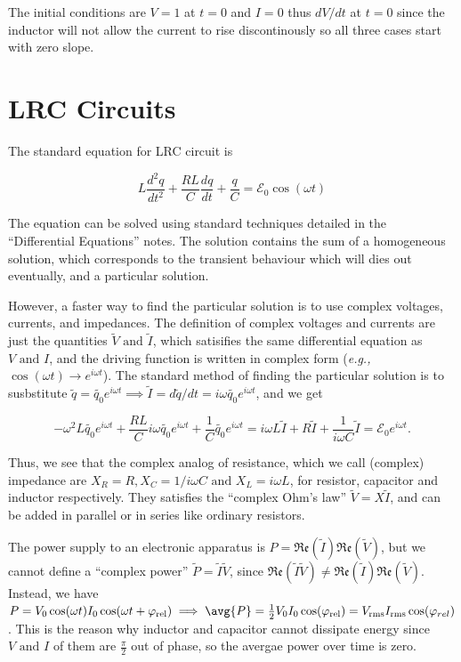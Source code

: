 \documentclass[english,a4paper,12pt]{report}
\begin{document}
The initial conditions are \(V=1\) at \(t=0\) and \(I = 0\)  thus \(dV /dt \)  at \(t=0\)  since the inductor will not allow the current to rise discontinously so all three cases start with zero slope.

\section{LRC Circuits}

The standard equation for LRC circuit is 

\begin{equation}
     L\frac{d^2q}{dt^2} + \frac{RL}{C}\frac{dq}{dt} + \frac{q}{C} = \mathcal{E}_{0}\cos (\omega t) 
\end{equation}

The equation can be solved using standard techniques detailed in the ``Differential Equations'' notes. The solution contains the sum of a homogeneous solution, which corresponds to the transient behaviour which will dies out eventually, and a particular solution. 

However, a faster way to find the particular solution is to use complex voltages, currents, and impedances. The definition of complex voltages and currents are just the quantities \(\tilde{V} \text { and } \tilde{I} \), which satisifies the same differential equation as \(V \text { and } I\), and the driving function is written in complex form (\textit{e.g.,} \(\cos (\omega t) \to e^{i \omega t} \)). The standard method of finding the particular solution is to susbstitute \(\tilde{q}  = \tilde{q_0 }e^{i \omega t} \implies \tilde{I} = d \tilde{q} /dt = i \omega \tilde{q_0 } e^{i \omega t}\), and we get

\begin{equation}
    -\omega ^2 L \tilde{q_0 }e^{i \omega t} + \frac{RL}{C} i \omega \tilde{q_0 } e^{i \omega t} + \frac{1}{C} \tilde{q_0 }e^{i \omega t} = i \omega L \tilde{I} + R \tilde{I} + \frac{1}{i \omega C} \tilde{I} = \mathcal{E}_{0}e^{i \omega t}.        
\end{equation}

Thus, we see that the complex analog of resistance, which we call (complex) impedance are \(X_{R} = R, X_{C} = 1 /i\omega C \text { and } X_{L} = i \omega L \), for resistor, capacitor and inductor respectively. They satisfies the ``complex Ohm's law'' \(\tilde{V} = X \tilde{I} \), and can be added in parallel or in series like ordinary resistors. 

The power supply to an electronic apparatus is \(P = \mathfrak{Re} (\tilde{I} )\mathfrak{Re} (\tilde{V} )  \), but we cannot define a ``complex power'' \(\tilde{P} = \tilde{I} \tilde{V}   \), since \(\mathfrak{Re} (\tilde{I} \tilde{V}  ) \neq \mathfrak{Re} (\tilde{I} ) \mathfrak{Re} (\tilde{V} )  \). Instead, we have \(P = V_0 \cos (\omega t) I_0 \cos (\omega t+ \varphi _{\text{rel} } ) \implies \avg{P} = \frac{1}{2}V_0 I_0 \cos (\varphi _{\text{rel} }) = V_{\text{rms} }I_{\text{rms} }\cos (\varphi _{rel})   \). This is the reason why inductor and capacitor cannot dissipate energy since \(V \text { and } I\) of them are \(\frac{\pi }{2} \) out of phase, so the avergae power over time is zero.  
\end{document}
